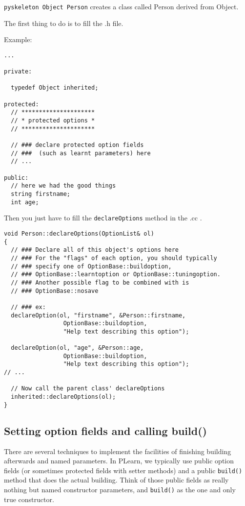 \documentclass[11pt]{book}
\begin{document}
\texttt{pyskeleton Object Person} creates a class called Person derived from Object.

The first thing to do is to fill the .h file.

Example:

\begin{verbatim}
...

private:
  
  typedef Object inherited;

protected:
  // *********************
  // * protected options *
  // *********************

  // ### declare protected option fields 
  // ###  (such as learnt parameters) here
  // ...
    
public:
  // here we had the good things
  string firstname;
  int age;

\end{verbatim}

Then you just have to fill the \texttt{declareOptions} method in the .cc .

\begin{verbatim}
void Person::declareOptions(OptionList& ol) 
{
  // ### Declare all of this object's options here
  // ### For the "flags" of each option, you should typically
  // ### specify one of OptionBase::buildoption, 
  // ### OptionBase::learntoption or OptionBase::tuningoption.
  // ### Another possible flag to be combined with is 
  // ### OptionBase::nosave

  // ### ex:
  declareOption(ol, "firstname", &Person::firstname, 
                 OptionBase::buildoption,
                 "Help text describing this option");

  declareOption(ol, "age", &Person::age, 
                 OptionBase::buildoption,
                 "Help text describing this option");
// ...

  // Now call the parent class' declareOptions
  inherited::declareOptions(ol);
}
\end{verbatim}

\subsection{Setting option fields and calling build()}

There are several techniques to implement the facilities of finishing
building afterwards and named parameters.  In PLearn, we typically
use public option fields (or sometimes protected fields with setter
methods) and a public {\tt build()} method that does the actual
building. Think of those public fields as really nothing but named
constructor parameters, and {\tt build()} as the one and only true
constructor.
\end{document}
